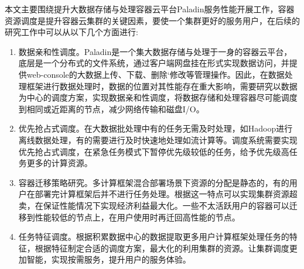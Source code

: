 本文主要围绕提升大数据存储与处理容器云平台Paladin服务性能开展工作，容器资源调度是提升容器云集群的关键因素，要使一个集群更好的服务用户，在后续的研究工作中可以从以下几个方面进行:
\begin{enumerate}[1.]
	\item 数据亲和性调度。Paladin是一个集大数据存储与处理于一身的容器云平台，底层是一个分布式的文件系统，通过客户端网盘挂在形式实现数据访问，并提供web-console的大数据上传、下载、删除‘修改等管理操作。因此，在数据处理框架进行数据处理时，数据的位置对其性能存在重大影响，需要研究以数据为中心的调度方案，实现数据亲和性调度，将数据存储和处理容器尽可能调度到相同或近距离的节点，减少网络传输和磁盘I/O。
	\item 优先抢占式调度。在大数据批处理中有的任务无需及时处理，如Hadoop进行离线数据处理，有的需要进行及时快速地处理如流计算等。调度系统需要实现优先抢占式调度，在紧急任务模式下暂停优先级较低的任务，给予优先级高任务更多的计算资源。
	\item 容器迁移策略研究。多计算框架混合部署场景下资源的分配是静态的，有的用户在部署完计算框架后并不进行任务处理。根据这一特点可以实现集群资源超卖，在保证性能情况下实现经济利益最大化。一些不太活跃用户的容器可以迁移到性能较低的节点上，在用户使用时再迁回高性能的节点。
	\item 任务特征调度。根据积累数据中心的数据提取更多用户计算框架处理任务的特征，根据特征制定合适的调度方案，最大化的利用集群的资源。让集群调度更加智能，实现按需服务，提升用户的服务体验。
\end{enumerate}